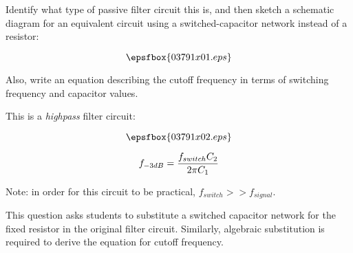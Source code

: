 

Identify what type of passive filter circuit this is, and then sketch a schematic diagram for an equivalent circuit using a switched-capacitor network instead of a resistor:

$$\epsfbox{03791x01.eps}$$

Also, write an equation describing the cutoff frequency in terms of switching frequency and capacitor values.







This is a {\it highpass} filter circuit:

$$\epsfbox{03791x02.eps}$$

$$f_{-3dB} = {{f_{switch} C_2} \over {2 \pi C_1}}$$

\vskip 10pt

Note: in order for this circuit to be practical, $f_{switch} >> f_{signal}$.







This question asks students to substitute a switched capacitor network for the fixed resistor in the original filter circuit.  Similarly, algebraic substitution is required to derive the equation for cutoff frequency.




